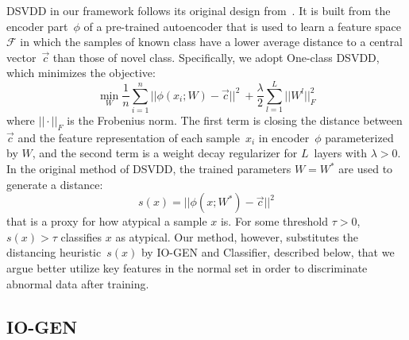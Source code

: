 \documentclass[letterpaper]{article} %
\begin{document}
DSVDD in our framework follows its original design
from~\citet{RVGDSBMK18}. It is built from the encoder part~$\phi$ of a
pre-trained autoencoder that is used to learn a feature
space~$\mathcal{F}$ in which the samples of known class have a lower
average distance to a central vector~$\vec{c}$ than those of novel
class. Specifically, we adopt One-class DSVDD, which minimizes the
objective:
\begin{equation*}
	\label{eq:dsvdd_obj}
		\min_{W} \frac{1}{n} \sum_{i=1}^{n} ||\phi(x_{i}; W) - \vec{c}||^{2} \
		+ \frac{\lambda}{2} \sum_{l=1}^{L} || W^l ||_{F}^{2}
\end{equation*}
where $|| \cdot ||_{F}$ is the Frobenius norm. The first term is closing
the distance between $\vec{c}$ and the feature representation of each
sample~$x_i$ in encoder~$\phi$ parameterized by $W$, and the second term
is a weight decay regularizer for $L$~layers with $\lambda > 0$. In the
original method of DSVDD, the trained parameters $W=W^*$ are used to
generate a distance:
\begin{equation*}
    \label{eq:dsvdd_score}
    s(x) = ||\phi(x;W^{*}) - \vec{c}||^2
\end{equation*}
that is a proxy for how atypical a sample $x$ is. For some threshold
$\tau > 0$, $s(x) > \tau$ classifies $x$ as atypical. Our method,
however, substitutes the distancing heuristic~$s(x)$ by \mbox{IO-GEN} and
Classifier, described below, that we argue better utilize key features
in the normal set in order to discriminate abnormal data after training.

\subsection{IO-GEN}
\label{sec:io_gen}
\end{document}
